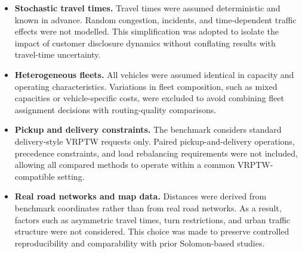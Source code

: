 \begin{itemize}

    \item \textbf{Stochastic travel times.}
Travel times were assumed deterministic and known in advance. Random congestion,
incidents, and time-dependent traffic effects were not modelled. This
simplification was adopted to isolate the impact of customer disclosure dynamics
without conflating results with travel-time uncertainty.

    \item \textbf{Heterogeneous fleets.}
All vehicles were assumed identical in capacity and operating characteristics.
Variations in fleet composition, such as mixed capacities or vehicle-specific
costs, were excluded to avoid combining fleet assignment decisions with
routing-quality comparisons.

    \item \textbf{Pickup and delivery constraints.}
The benchmark considers standard delivery-style VRPTW requests only. Paired
pickup-and-delivery operations, precedence constraints, and load rebalancing
requirements were not included, allowing all compared methods to operate within
a common VRPTW-compatible setting.

    \item \textbf{Real road networks and map data.}
Distances were derived from benchmark coordinates rather than from real road
networks. As a result, factors such as asymmetric travel times, turn
restrictions, and urban traffic structure were not considered. This choice was
made to preserve controlled reproducibility and comparability with prior
Solomon-based studies.


\end{itemize}
